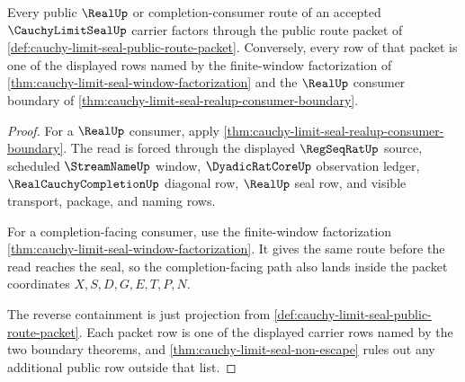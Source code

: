 \begin{theorem}
\label{thm:cauchy-limit-seal-public-route-boundary}
Every public $\RealUp$ or completion-consumer route of an accepted $\CauchyLimitSealUp$ carrier factors through the public route packet of \autoref{def:cauchy-limit-seal-public-route-packet}. Conversely, every row of that packet is one of the displayed rows named by the finite-window factorization of \autoref{thm:cauchy-limit-seal-window-factorization} and the $\RealUp$ consumer boundary of \autoref{thm:cauchy-limit-seal-realup-consumer-boundary}.
\end{theorem}
\begin{proof}
For a $\RealUp$ consumer, apply \autoref{thm:cauchy-limit-seal-realup-consumer-boundary}. The read is forced through the displayed $\RegSeqRatUp$ source, scheduled $\StreamNameUp$ window, $\DyadicRatCoreUp$ observation ledger, $\RealCauchyCompletionUp$ diagonal row, $\RealUp$ seal row, and visible transport, package, and naming rows.

For a completion-facing consumer, use the finite-window factorization \autoref{thm:cauchy-limit-seal-window-factorization}. It gives the same route before the read reaches the seal, so the completion-facing path also lands inside the packet coordinates $X,S,D,G,E,T,P,N$.

The reverse containment is just projection from \autoref{def:cauchy-limit-seal-public-route-packet}. Each packet row is one of the displayed carrier rows named by the two boundary theorems, and \autoref{thm:cauchy-limit-seal-non-escape} rules out any additional public row outside that list.
\end{proof}

